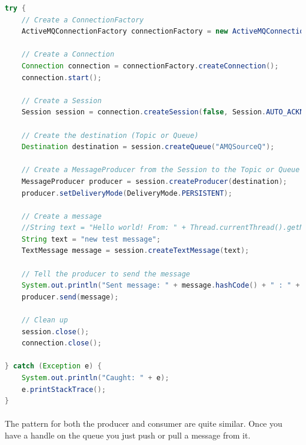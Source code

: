\documentclass[
10pt, %
letterpaper, %
oneside, %
headinclude,footinclude, %
BCOR5mm, %
]{scrartcl}
\begin{document}
\begin{lstlisting}[language=Java]
try {
	// Create a ConnectionFactory
	ActiveMQConnectionFactory connectionFactory = new ActiveMQConnectionFactory("tcp://opmq1.outsmartinc.com:61616");

	// Create a Connection
	Connection connection = connectionFactory.createConnection();
	connection.start();

	// Create a Session
	Session session = connection.createSession(false, Session.AUTO_ACKNOWLEDGE);

	// Create the destination (Topic or Queue)
	Destination destination = session.createQueue("AMQSourceQ");

	// Create a MessageProducer from the Session to the Topic or Queue
	MessageProducer producer = session.createProducer(destination);
	producer.setDeliveryMode(DeliveryMode.PERSISTENT);

	// Create a message
	//String text = "Hello world! From: " + Thread.currentThread().getName() + " : " + this.hashCode();
	String text = "new test message";
	TextMessage message = session.createTextMessage(text);

	// Tell the producer to send the message
	System.out.println("Sent message: " + message.hashCode() + " : " + Thread.currentThread().getName());
	producer.send(message);

	// Clean up
	session.close();
	connection.close();
	
} catch (Exception e) {
	System.out.println("Caught: " + e);
	e.printStackTrace();
}
\end{lstlisting}

\paragraph{}
The pattern for both the producer and consumer are quite similar. Once you have a handle on the queue you just push or pull a message from it.
\end{document}
